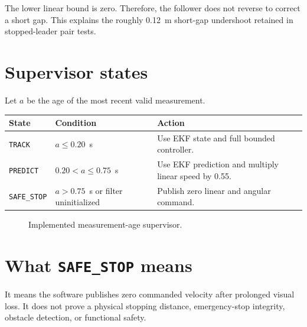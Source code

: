 \documentclass[11pt,oneside,openany]{book}
\newcommand{\state}[1]{\texttt{#1}}
\begin{document}
The lower linear bound is zero. Therefore, the follower does not reverse to correct a short gap. This explains the roughly 0.12~m short-gap undershoot retained in stopped-leader pair tests.

\section{Supervisor states}

Let $a$ be the age of the most recent valid measurement.
\begin{longtable}{@{}p{}p{}p{}@{}}
\toprule
State & Condition & Action \\
\midrule
\endhead
\state{TRACK} & $a\leq0.20$~s & Use EKF state and full bounded controller. \\
\state{PREDICT} & $0.20<a\leq0.75$~s & Use EKF prediction and multiply linear speed by 0.55. \\
\state{SAFE\_STOP} & $a>0.75$~s or filter uninitialized & Publish zero linear and angular command. \\
\bottomrule
\end{longtable}

\begin{figure}[htbp]
\centering
{}
\caption{Implemented measurement-age supervisor.}
\end{figure}

\section{What \state{SAFE\_STOP} means}

It means the software publishes zero commanded velocity after prolonged visual loss. It does not prove a physical stopping distance, emergency-stop integrity, obstacle detection, or functional safety.
\end{document}
